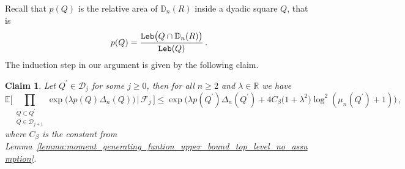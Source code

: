 \documentclass[11pt]{amsart}
\newtheorem{claim}[theorem]{Claim}
\theoremstyle{definition}
\theoremstyle{remark}
\numberwithin{equation}{section}
\def\la{{\lambda}}
\newcommand{\bR}{\mathbb R}
\newcommand{\bD}{\mathbb D}
\newcommand{\bE}{\mathbb E}
\begin{document}
	Recall that $p(Q)$ is the relative area of $\bD_n(R)$ inside a dyadic square $Q$, that is
	\[
	p(Q) = \frac{{\tt Leb}\big(Q\cap \bD_n(R)\big)}{{\tt Leb}(Q)} \, .
	\]	
	The induction step in our argument is given by the following claim.
	\begin{claim}
		\label{claim:conditional_upper_bound_on_MGF_one_level_down}
		Let $Q^\prime\in \mathcal{D}_j$ for some $j\ge 0$, then for all $n\ge 2$ and $\la\in \bR$ we have
		\begin{equation*}
			\bE\Bigg[\prod_{\substack{Q\subset Q^\prime \\ Q\in \mathcal{D}_{j+1}}} \exp\Big(\la  p(Q)  \Delta_n(Q)\Big)  \, \Big| \, \mathcal{F}_j \, \Bigg] \le \exp\bigg(\la p(Q^\prime) \Delta_n(Q^\prime) + 4C_\beta\big(1+\la^2\big)\log^2(\mu_n(Q^\prime)+1)\bigg) \, ,
		\end{equation*}
		where $C_\beta$ is the constant from Lemma~\ref{lemma:moment_generating_funtion_upper_bound_top_level_no_assumption}.
	\end{claim}
\end{document}
